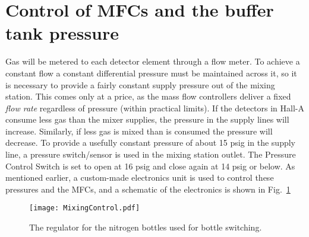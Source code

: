 \section{Control of MFCs and the buffer tank pressure}
Gas will be metered to each detector element through a flow meter.
To achieve a constant flow a constant
differential pressure must be maintained across it, so it is necessary
to provide a fairly constant supply pressure out of the mixing
station.  This comes only at a price, as the mass flow controllers
deliver a fixed {\it flow rate} regardless of pressure (within
practical limits).  If the detectors in Hall-A consume less gas than
the mixer supplies, the pressure in the supply lines will increase.
Similarly, if less gas is mixed than is consumed the pressure will
decrease.  To provide a usefully constant pressure of about 15 psig in
the supply line, a pressure switch/sensor is used in the
mixing station outlet.  The Pressure
Control Switch is set to open at 16 psig and close again at 14 psig
or below. As mentioned earlier, a custom-made electronics unit is used to control
these pressures and the MFCs, and a schematic of the electronics is shown in Fig.~\ref{fig:SwitchingElectronics}


\begin{figure}[h!]
\begin{center}
\texttt{[image: MixingControl.pdf]}
\caption{The regulator for the nitrogen bottles used for bottle switching.}
\label{fig:SwitchingElectronics}
\end{center}
\end{figure}



